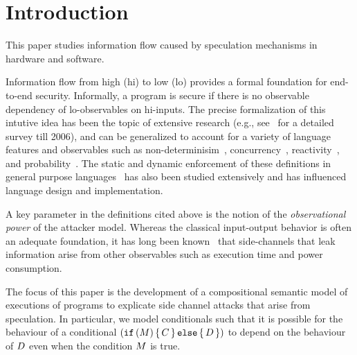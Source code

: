 \section{Introduction}

This paper studies information flow caused by speculation mechanisms
in hardware and software.

Information flow from high (hi) to low (lo) provides a formal
foundation for end-to-end security.  Informally, a program is secure
if there is no observable dependency of lo-observables on hi-inputs.
The precise formalization of this intutive idea has been the topic of
extensive research (e.g., see~\cite{Sabelfeld:2006:LIS:2312191.2314769}  for a detailed survey till
2006), and can be generalized to account for a variety of language
features and observables such as non-determinisim~\cite{Wittbold1990InformationFI},
concurrency~\cite{Smith:1998:SIF:268946.268975}, reactivity~\cite{O'Neill:2006:ISI:1155442.1155677}, and
probability~\cite{Gray:1992:TMF:2699806.2699811}. The static and dynamic enforcement
of these definitions in general purpose languages~\cite{myers-popl99} has also
been studied extensively and has influenced language design and
implementation.

A key parameter in the definitions cited above is the notion of
the \emph{observational power} of the attacker model. Whereas the classical
input-output behavior is often an adequate foundation,
it has long been known~\cite{Lampson:1973:NCP:362375.362389,Biswas:2017:STC:3058791.3023872} that side-channels that leak
information arise from other observables such as execution time and
power consumption.

The focus of this paper is the development of a compositional semantic model of
executions of programs to explicate side channel attacks that arise
from speculation. In particular, we model conditionals such that it is
possible for the behaviour of a conditional
$(\texttt{if}\,(M)\,\{\, C \,\}\,\texttt{else}\,\{\, D \,\})$ to depend on the behaviour
of $D$ even when the condition $M$ is true.

